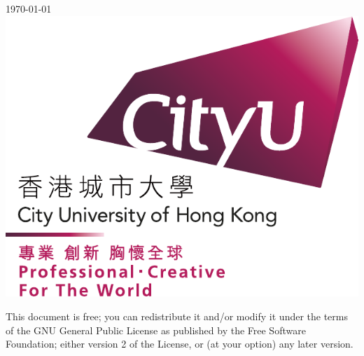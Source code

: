 \documentclass[UTF8,a4paper,openany]{book}
\theoremstyle{plain}
\theoremstyle{definition}
\begin{document}
\begin{titlepage}



{\large \today}\\[2cm] %

\vspace{5cm}
\includegraphics[scale=0.2]{figures/CityU_full_logo_2015.pdf}\\[1cm] %


\vfill %
\end{titlepage}

\noindent

This document is free; you can redistribute it and/or modify it under the terms of the GNU General Public License as published by the Free Software Foundation; either version 2 of the License, or (at your option) any later version.
\end{document}
